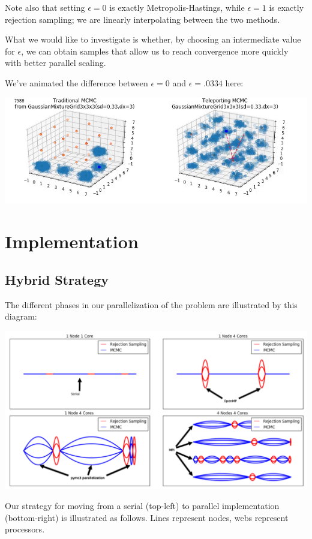 \documentclass{article}
\begin{document}
Note also that setting $\epsilon=0$ is exactly Metropolis-Hastings, while
$\epsilon=1$ is exactly rejection sampling; we are linearly interpolating
between the two methods.

What we would like to investigate is whether, by choosing an intermediate value
for $\epsilon$, we can obtain samples that allow us to reach convergence
more quickly with better parallel scaling.

We've animated the difference between $\epsilon=0$ and $\epsilon=.0334$
here:

\includegraphics[width=\textwidth]{mcmc-tel-animation.png}

\section{Implementation}

\subsection{Hybrid Strategy}

The different phases in our parallelization of the problem are illustrated by
this diagram:

\includegraphics[width=\textwidth]{odyssey-setup.png}

Our strategy for moving from a serial (top-left) to parallel implementation
(bottom-right) is illustrated as follows. Lines represent nodes, webs represent
processors.
\end{document}
